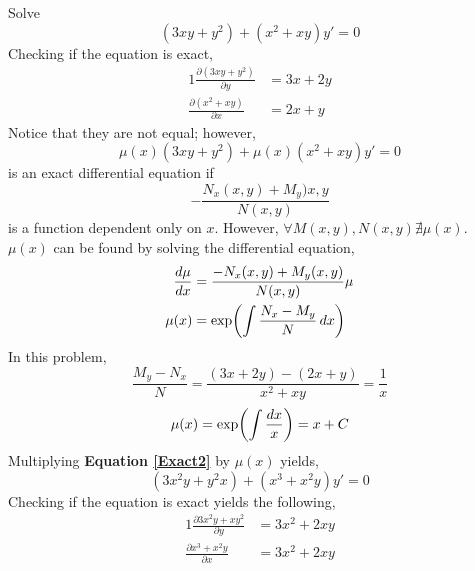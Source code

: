 \documentclass[twoside]{report}
\begin{document}
    \begin{example}
        Solve
        \begin{equation}
            \label{Exact2}
            (3xy + y^{2}) + (x^{2} + xy)y' = 0
        \end{equation}
        Checking if the equation is exact,
        \begin{alignat}{1}
            \frac{\partial (3xy + y^{2})}{\partial y} &= 3x + 2y\\
            \frac{\partial (x^{2} + xy)}{\partial x} &= 2x + y
        \end{alignat}
        Notice that they are not equal; however,
        \begin{equation}
            \mu(x)(3xy + y^{2}) + \mu(x)(x^{2} + xy)y' = 0
        \end{equation}
        is an exact differential equation if
        \begin{equation}
            -\frac{N_{x}(x, y) + M_{y})x, y}{N(x, y)}
        \end{equation}
        is a function dependent only on $x$. However, $\forall M(x, y), N(x, y) \nexists \mu(x)$. $\mu(x)$ can be found by solving the differential equation,
        \begin{alignat}{1}
            \frac{d\mu}{dx} &= \frac{-N_{x}(x, y) + M_{y}(x, y)}{N(x, y)}\mu\\
            \mu(x) &= \exp\bbbp{\int\frac{N_{x} - M_{y}}{N}\,dx}
        \end{alignat}
        In this problem,
        \begin{equation}
            \frac{M_{y} - N_{x}}{N} = \frac{(3x + 2y) - (2x + y)}{x^2 + xy} = \frac{1}{x}
        \end{equation}
        \begin{equation}
            \mu(x) = \exp\bbbp{\int\frac{dx}{x}} = x + C
        \end{equation}
        Multiplying \textbf{Equation \ref{Exact2}} by $\mu(x)$ yields,
        \begin{equation}
            (3x^{2}y + y^{2}x) + (x^{3} + x^{2}y)y' = 0
        \end{equation}
        Checking if the equation is exact yields the following,
        \begin{alignat}{1}
            \frac{\partial 3x^{2}y + xy^{2}}{\partial y} &= 3x^{2} + 2xy\\
            \frac{\partial x^{3} + x^{2}y}{\partial x} &= 3x^{2} + 2xy
        \end{alignat}

\end{example}
\end{document}
